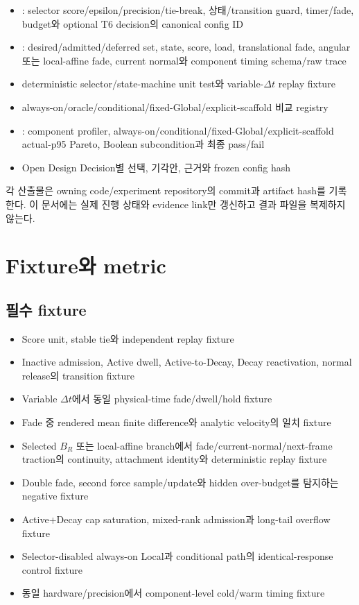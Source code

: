 \documentclass[10pt]{article}
\begin{document}
\begin{itemize}
  \item {}: selector score/epsilon/precision/tie-break, 상태/transition guard,
  timer/fade, budget와 optional T6 decision의 canonical config ID
  \item {}: desired/admitted/deferred set, state, score, load,
  translational fade, angular 또는 local-affine fade, current normal와 component timing schema/raw trace
  \item deterministic selector/state-machine unit test와 variable-\(\Delta t\) replay fixture
  \item always-on/oracle/conditional/fixed-Global/explicit-scaffold 비교 registry
  \item {}: component profiler, always-on/conditional/fixed-Global/explicit-scaffold
  actual-p95 Pareto, Boolean subcondition과 최종 pass/fail
  \item Open Design Decision별 선택, 기각안, 근거와 frozen config hash
\end{itemize}

각 산출물은 owning code/experiment repository의 commit과 artifact hash를 기록한다. 이 문서에는 실제 진행 상태와
evidence link만 갱신하고 결과 파일을 복제하지 않는다.

\section{Fixture와 metric}
\label{sec:r6-chapter-7}

\subsection{필수 fixture}

\begin{itemize}
  \item Score unit, stable tie와 independent replay fixture
  \item Inactive admission, Active dwell, Active-to-Decay, Decay reactivation, normal release의 transition fixture
  \item Variable \(\Delta t\)에서 동일 physical-time fade/dwell/hold fixture
  \item Fade 중 rendered mean finite difference와 analytic velocity의 일치 fixture
  \item Selected \(B_R\) 또는 local-affine branch에서 fade/current-normal/next-frame traction의
  continuity, attachment identity와 deterministic replay fixture
  \item Double fade, second force sample/update와 hidden over-budget를 탐지하는 negative fixture
  \item Active+Decay cap saturation, mixed-rank admission과 long-tail overflow fixture
  \item Selector-disabled always-on Local과 conditional path의 identical-response control fixture
  \item 동일 hardware/precision에서 component-level cold/warm timing fixture
\end{itemize}
\end{document}
